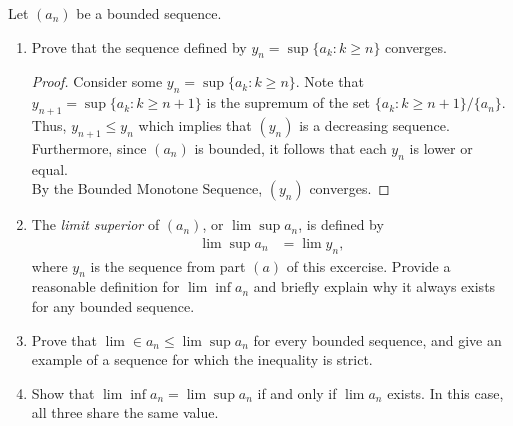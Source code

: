 \documentclass[12pt]{article}
\newenvironment{problem}[2][Problem]{\begin{trivlist} \item[\hskip \labelsep {\bfseries #1}\hskip \labelsep {\bfseries #2.}]}{\end{trivlist}}
\begin{document}
\begin{problem}{2.4.7 (Limit Superior)}
  Let $(a_{n})$ be a bounded sequence.
\begin{enumerate}
  \item Prove that the sequence defined by $y_{n}=\sup\{a_{k}:k\geq n\}$ converges.
\begin{proof}
  Consider some $y_{n}=\sup\{a_{k}:k\geq n\}$. Note that $y_{n+1}=\sup\{a_{k}:k\geq n+1\}$ is the supremum of the set $\{a_{k}:k\geq n+1\}/\{a_{n}\}$. Thus, $y_{n+1}\leq y_{n}$ which implies that $(y_{n})$ is a decreasing sequence. Furthermore, since $(a_{n})$ is bounded, it follows that each $y_{n}$ is lower or equal. \\
  By the Bounded Monotone Sequence, $(y_{n})$ converges.
\end{proof}
  \item The \textit{limit superior} of $(a_{n})$, or $\lim\sup a_{n}$, is defined by
\begin{align*}
  \lim\sup a_{n} &= \lim y_{n},
\end{align*}
where $y_{n}$ is the sequence from part $(a)$ of this excercise. Provide a reasonable definition for $\lim\inf a_{n}$ and briefly explain why it always exists for any bounded sequence.
\item Prove that $\lim\in a_{n} \leq \lim\sup a_{n}$ for every bounded sequence, and give an example of a sequence for which the inequality is strict.
\item Show that $\lim\inf a_{n} = \lim\sup a_{n}$ if and only if $\lim a_{n}$ exists. In this case, all three share the same value. 
\end{enumerate}
\end{problem}
\end{document}
